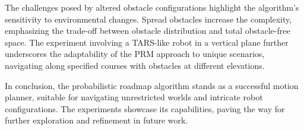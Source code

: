 \documentclass{IEEEtaes}
\begin{document}
The challenges posed by altered obstacle configurations highlight the algorithm's sensitivity to environmental changes. Spread obstacles increase the complexity, emphasizing the trade-off between obstacle distribution and total obstacle-free space. The experiment involving a TARS-like robot in a vertical plane further underscores the adaptability of the PRM approach to unique scenarios, navigating along specified courses with obstacles at different elevations.

In conclusion, the probabilistic roadmap algorithm stands as a successful motion planner, suitable for navigating unrestricted worlds and intricate robot configurations. The experiments showcase its capabilities, paving the way for further exploration and refinement in future work.



\ %
\end{document}
